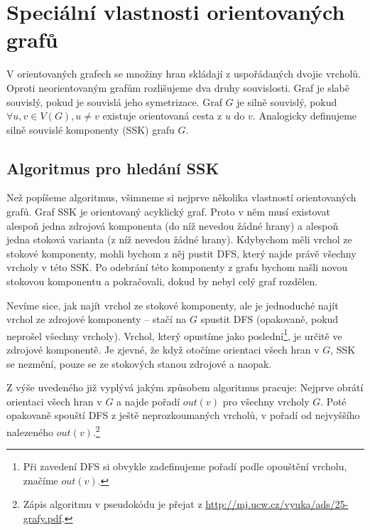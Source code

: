 \section{Speciální vlastnosti orientovaných grafů}

\label{silna-souvislost}

V orientovaných grafech se množiny hran skládají z uspořádaných dvojic vrcholů.
Oproti neorientovaným grafům rozlišujeme dva druhy souvislosti. Graf je slabě
souvislý, pokud je souvislá jeho symetrizace. Graf $G$ je silně souvislý, pokud
$\forall u,v \in V(G), u\neq v$ existuje orientovaná cesta z $u$ do $v$.
Analogicky definujeme silně souvislé komponenty (SSK) grafu $G$.

\subsection{Algoritmus pro hledání SSK}

Než popíšeme algoritmus, všimneme si nejprve několika vlastností orientovaných grafů. Graf SSK je orientovaný acyklický graf. Proto v něm musí existovat alespoň jedna zdrojová komponenta (do níž nevedou žádné hrany) a alespoň jedna stoková varianta (z níž nevedou žádné hrany). Kdybychom měli vrchol ze stokové komponenty, mohli bychom z něj pustit DFS, který najde právě všechny vrcholy v této SSK. Po odebrání této komponenty z grafu bychom našli novou stokovou komponentu a pokračovali, dokud by nebyl celý graf rozdělen.

Nevíme sice, jak najít vrchol ze stokové komponenty, ale je jednoduché najít vrchol ze zdrojové komponenty -- stačí na $G$ spustit DFS (opakovaně, pokud neprošel všechny vrcholy). Vrchol, který opustíme jako poslední\footnote{Při zavedení DFS si obvykle zadefinujeme pořadí podle opouštění vrcholu, značíme $out(v)$.}, je určitě ve zdrojové komponentě. Je zjevné, že když otočíme orientaci všech hran v $G$, SSK se nezmění, pouze se ze stokových stanou zdrojové a naopak.


Z výše uvedeného již vyplývá jakým způsobem algoritmus pracuje: Nejprve obrátí orientaci všech hran v $G$ a najde pořadí $out(v)$ pro všechny vrcholy $G$. Poté opakovaně spouští DFS z ještě neprozkoumaných vrcholů, v pořadí od nejvyššího nalezeného $out(v)$.\footnote{Zápis algoritmu v pseudokódu je přejat z \url{http://mj.ucw.cz/vyuka/ads/25-grafy.pdf}.}

